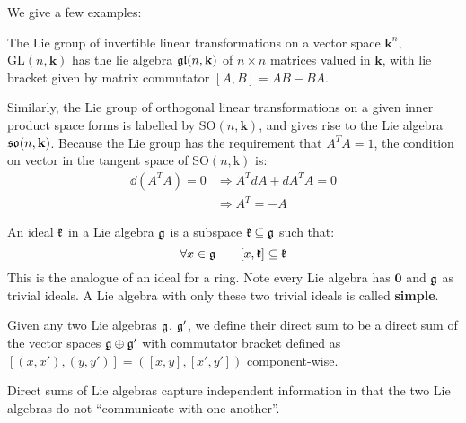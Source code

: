 		We give a few examples:
		\begin{eg}
			The Lie group of invertible linear transformations on a vector space $\mathbf k^n$, $\mathrm{GL}(n, \mathbf k)$ has the lie algebra $\frak{gl}(n, \mathbf k)$ of $n \times n$ matrices valued in $\mathbf k$, with lie bracket given by matrix commutator $[A, B] = AB - BA$.
		\end{eg}
		
		\begin{eg}
			Similarly, the Lie group of orthogonal linear transformations on a given inner product space forms is labelled by $\mathrm{SO}(n, \mathbf k)$, and gives rise to the Lie algebra $\frak{so}(n, \mathbf k)$. Because the Lie group has the requirement that $A^T A = 1$, the condition on vector in the tangent space of $\mathrm{SO}(n, \mathrm k)$ is:
			\begin{equation}
				\begin{aligned}
					\dd(A^T A)  = 0 &\Rightarrow A^T dA + d{A^T} A = 0 \\
									&\Rightarrow A^{T} = - A
				\end{aligned}
			\end{equation}
		\end{eg}
		
		\begin{defn}[Ideal]
			An ideal $\frak k$ in a Lie algebra $\frak g$ is a subspace $\frak k \subseteq \frak g$ such that:
			\begin{equation}
				 \forall x \in \frak g \qquad [x, \frak k] \subseteq \frak k
			\end{equation}
			This is the analogue of an ideal for a ring. Note every Lie algebra has $\mathbf 0$ and $\frak g$ as trivial ideals. A Lie algebra with only these two trivial ideals is called \textbf{simple}.
		\end{defn}
		
		\begin{defn}
			Given any two Lie algebras $\frak g$, $\frak g'$, we define their direct sum to be a direct sum of the vector spaces $\frak g \oplus \frak g'$ with commutator bracket defined as $[(x,x'), (y, y')] = ([x, y], [x', y'])$ component-wise.
		\end{defn}
		Direct sums of Lie algebras capture independent information in that the two Lie algebras do not ``communicate with one another''.
		
